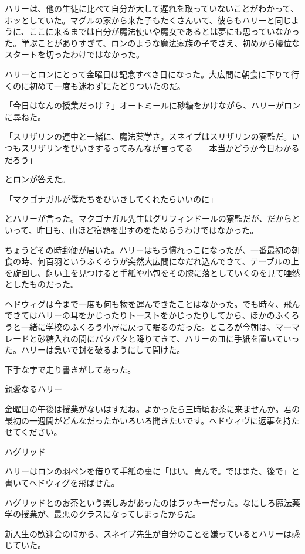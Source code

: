 \documentclass[10pt,a4paper]{article}
\begin{document}
\begin{CJK}{UTF8}{min}
ハリーは、他の生徒に比べて自分が大して遅れを取っていないことがわかって、ホッとしていた。マグルの家から来た子もたくさんいて、彼らもハリーと同じように、ここに来るまでは自分が魔法使いや魔女であるとは夢にも思っていなかった。学ぶことがありすぎて、ロンのような魔法家族の子でさえ、初めから優位なスタートを切ったわけではなかった。

ハリーとロンにとって金曜日は記念すべき日になった。大広間に朝食に下りて行くのに初めて一度も迷わずにたどりついたのだ。

「今日はなんの授業だっけ？」オートミールに砂糖をかけながら、ハリーがロンに尋ねた。

「スリザリンの連中と一緒に、魔法薬学さ。スネイプはスリザリンの寮監だ。いつもスリザリンをひいきするってみんなが言ってる――本当かどうか今日わかるだろう」

とロンが答えた。

「マクゴナガルが僕たちをひいきしてくれたらいいのに」

とハリーが言った。マクゴナガル先生はグリフィンドールの寮監だが、だからといって、昨日も、山ほど宿題を出すのをためらうわけではなかった。

ちょうどその時郵便が届いた。ハリーはもう慣れっこになったが、一番最初の朝食の時、何百羽というふくろうが突然大広間になだれ込んできて、テーブルの上を旋回し、飼い主を見つけると手紙や小包をその膝に落としていくのを見て唖然としたものだった。

ヘドウィグは今まで一度も何も物を運んできたことはなかった。でも時々、飛んできてはハリーの耳をかじったりトーストをかじったりしてから、ほかのふくろうと一緒に学校のふくろう小屋に戻って眠るのだった。ところが今朝は、マーマレードと砂糖入れの間にパタパタと降りてきて、ハリーの皿に手紙を置いていった。ハリーは急いで封を破るようにして開けた。

下手な字で走り書きがしてあった。



親愛なるハリー

金曜日の午後は授業がないはすだね。よかったら三時頃お茶に来ませんか。君の最初の一週間がどんなだったかいろいろ聞きたいです。ヘドウィヴに返事を持たせてください。

ハグリッド



ハリーはロンの羽ペンを借りて手紙の裏に「はい。喜んで。ではまた、後で」と書いてヘドウィグを飛ばせた。

ハグリッドとのお茶という楽しみがあったのはラッキーだった。なにしろ魔法薬学の授業が、最悪のクラスになってしまったからだ。

新入生の歓迎会の時から、スネイプ先生が自分のことを嫌っているとハリーは感じていた。


\end{CJK}
\end{document}
